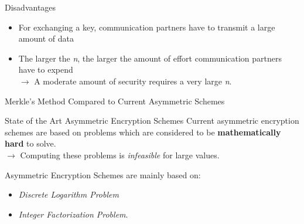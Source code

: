 \documentclass[final]{beamer}
\begin{document}
\begin{frame}[fragile]
\begin{columns}[t]
\begin{rightcolumn}
   \begin{boxblock}{Disadvantages}
   	\justifying
   	\begin{itemize}
   		\item For exchanging a key, communication partners have to transmit a large amount of data
   		\item The larger the \emph{n}, the larger the amount of effort communication partners have to expend \\
   		$\rightarrow$ A moderate amount of security requires a very large \emph{n}. 
   	\end{itemize}
   	\end{boxblock}

   \begin{boxblock}{Merkle's Method Compared to Current Asymmetric Schemes}
\justifying
     	\begin{block}{State of the Art Asymmetric Encryption Schemes}
     			\justifying
     	Current asymmetric encryption schemes are based on problems which are considered to be \textbf{mathematically hard} to solve. \\ 
     	$\rightarrow$ Computing these problems is \emph{infeasible} for  large values. \\
     \end{block}
	Asymmetric Encryption Schemes are mainly based on:
     		\begin{itemize}
     			\item \emph{Discrete Logarithm Problem}
     			\item \emph{Integer Factorization Problem}. 
     		\end{itemize}
   
        
        
%   

        
     

\end{boxblock}
\end{rightcolumn}
\end{columns}
\end{frame}
\end{document}

